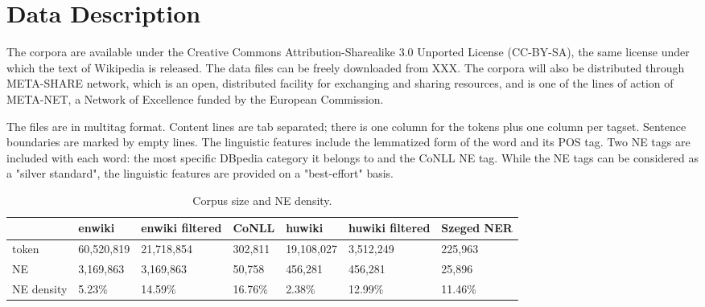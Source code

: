 \documentclass[11pt]{article}
\begin{document}

\section{Data Description}
\label{sec:data}

The corpora are available under the Creative Commons Attribution-Sharealike 3.0 Unported License (CC-BY-SA), the same license under which the text of Wikipedia is released. The data files can be freely downloaded from XXX. The corpora will also be distributed through META-SHARE network, which is an open, distributed facility for exchanging and sharing resources, and is one of the lines of action of META-NET, a Network of Excellence funded by the European Commission. 

The files are in multitag format. Content lines are tab separated; there is one column for the tokens plus one column per tagset. Sentence boundaries are marked by empty lines. The linguistic features include the lemmatized form of the word and its POS tag. Two NE tags are included with each word: the most specific DBpedia category it belongs to and the CoNLL NE tag. While the NE tags can be considered as a "silver standard", the linguistic features are provided on a "best-effort" basis.

\begin{table*}[ht]
\begin{center}
\begin{tabular}{lllllll}
\hline  & \bf enwiki & \bf enwiki filtered & \bf CoNLL & \bf huwiki & \bf huwiki filtered  & \bf Szeged NER \\ \hline
token & 60,520,819 & 21,718,854 & 302,811 &  19,108,027 & 3,512,249  & 225,963\\
NE & 3,169,863 & 3,169,863 & 50,758 & 456,281 & 456,281  & 25,896\\
NE density & 5.23\% & 14.59\% & 16.76\% & 2.38\% & 12.99\%  & 11.46\%\\
\hline
\end{tabular}
\end{center}
\caption{\label{size} Corpus size and NE density.}
\end{table*}
\end{document}
